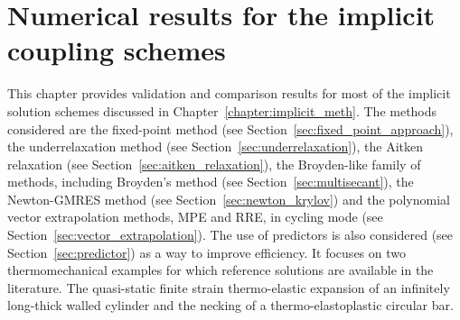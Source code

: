  \chapter{Numerical results for the implicit coupling schemes}

This chapter provides validation and comparison results for most of the implicit solution schemes discussed in Chapter~\ref{chapter:implicit_meth}.
The methods considered are the fixed-point method (see Section~\ref{sec:fixed_point_approach}), the underrelaxation method (see Section~\ref{sec:underrelaxation}), the Aitken relaxation (see Section~\ref{sec:aitken_relaxation}), the Broyden-like family of methods, including Broyden's method (see Section~\ref{sec:multisecant}), the Newton-GMRES method (see Section~\ref{sec:newton_krylov}) and the polynomial vector extrapolation methods, MPE and RRE, in cycling mode (see Section~\ref{sec:vector_extrapolation}).
The use of predictors is also considered (see Section~\ref{sec:predictor}) as a way to improve efficiency.
It focuses on two thermomechanical examples for which reference solutions are available in the literature.
The quasi-static finite strain thermo-elastic expansion of an infinitely long-thick walled cylinder and the necking of a thermo-elastoplastic circular bar.

